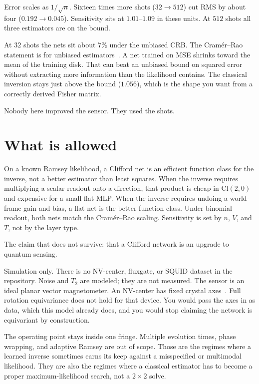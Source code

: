 \documentclass[11pt]{article}
\begin{document}
Error scales as $1/\sqrt{n}$.
Sixteen times more shots ($32\to 512$) cut RMS by about four ($0.192\to 0.045$).
Sensitivity sits at $1.01$--$1.09$ in these units.
At $512$ shots all three estimators are on the bound.

At $32$ shots the nets sit about $7\%$ under the unbiased CRB.
The Cram\'er--Rao statement is for unbiased estimators~\citep{helstrom1969}.
A net trained on MSE shrinks toward the mean of the training disk.
That can beat an unbiased bound on squared error without extracting more information than the likelihood contains.
The classical inversion stays just above the bound ($1.056$), which is the shape you want from a correctly derived Fisher matrix.

Nobody here improved the sensor.
They used the shots.

\section{What is allowed}

On a known Ramsey likelihood, a Clifford net is an efficient function class for the inverse, not a better estimator than least squares.
When the inverse requires multiplying a scalar readout onto a direction, that product is cheap in $\mathrm{Cl}(2,0)$ and expensive for a small flat MLP.
When the inverse requires undoing a world-frame gain and bias, a flat net is the better function class.
Under binomial readout, both nets match the Cram\'er--Rao scaling.
Sensitivity is set by $n$, $V$, and $T$, not by the layer type.

The claim that does not survive: that a Clifford network is an upgrade to quantum sensing.

Simulation only.
There is no NV-center, fluxgate, or SQUID dataset in the repository.
Noise and $T_2$ are modeled; they are not measured.
The sensor is an ideal planar vector magnetometer.
An NV-center has fixed crystal axes~\citep{zhang2024}.
Full rotation equivariance does not hold for that device.
You would pass the axes in as data, which this model already does, and you would stop claiming the network is equivariant by construction.

The operating point stays inside one fringe.
Multiple evolution times, phase wrapping, and adaptive Ramsey are out of scope.
Those are the regimes where a learned inverse sometimes earns its keep against a misspecified or multimodal likelihood.
They are also the regimes where a classical estimator has to become a proper maximum-likelihood search, not a $2\times 2$ solve.
\end{document}
